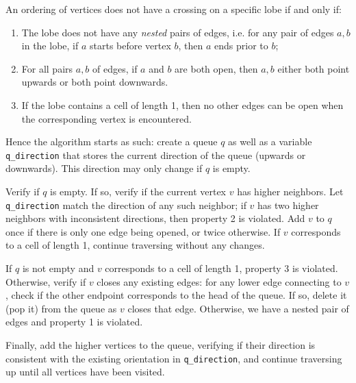 \documentclass[12pt, letterpaper]{article}
\begin{document}
    An ordering of vertices does not have a crossing on a specific lobe if and only if:
    
        \begin{enumerate}
            \item The lobe does not have any \emph{nested} pairs of edges, i.e. for any pair of edges $a, b$ in the lobe,  if $a$ starts before vertex $b$, then $a$ ends prior to $b$;
            
            \item For all pairs $a,b$ of edges, if $a$ and $b$ are both open, then $a,b$ either both point upwards or both point downwards.
            
            \item If the lobe contains a cell of length 1, then no other edges can be open when the corresponding vertex is encountered.
        \end{enumerate}
        
    Hence the algorithm starts as such: create a queue $q$ as well as a variable \texttt{q\_direction} that stores the current direction of the queue (upwards or downwards). This direction may only change if $q$ is empty.
    
    Verify if $q$ is empty. If so, verify if the current vertex $v$ has higher neighbors. Let \texttt{q\_direction} match the direction of any such neighbor; if $v$ has two higher neighbors with inconsistent directions, then property 2 is violated. Add $v$ to $q$ once if there is only one edge being opened, or twice otherwise. If $v$ corresponds to a cell of length 1, continue traversing without any changes.
    
    If $q$ is not empty and $v$ corresponds to a cell of length 1, property 3 is violated. Otherwise, verify if $v$ closes any existing edges: for any lower edge connecting to $v$, check if the other endpoint corresponds to the head of the queue. If so, delete it (pop it) from the queue as $v$ closes that edge. Otherwise, we have a nested pair of edges and property 1 is violated.
    
    Finally, add the higher vertices to the queue, verifying if their direction is consistent with the existing orientation in \texttt{q\_direction}, and continue traversing up until all vertices have been visited.
    
    
    
\end{document}
